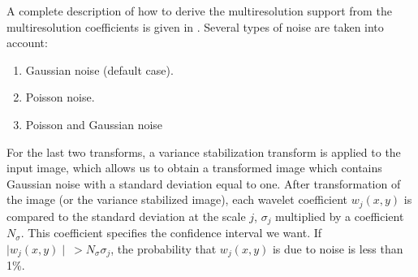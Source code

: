 A complete description of how to derive the multiresolution support from
the multiresolution coefficients is given in \cite{starck:sta95_1,starck:book98}. Several types
of noise are taken into account:
\begin{enumerate}
\item Gaussian noise (default case).
\item Poisson noise.
\item Poisson and Gaussian noise
\end{enumerate}
For the last two transforms, a variance stabilization transform is applied
to the input image, which allows us to obtain a transformed image which
contains  Gaussian noise with a standard deviation equal to one. After
transformation of the image (or the variance stabilized image), each
wavelet coefficient $w_j(x,y)$ is compared to the standard deviation at 
the scale $j$, $\sigma_j$ multiplied by a coefficient $N_\sigma$. 
This coefficient specifies 
the confidence interval we want. If $\mid w_j(x,y) \mid \ 
> N_\sigma \sigma_j$, the
probability that $w_j(x,y)$ is due to noise is less than 1\%.


